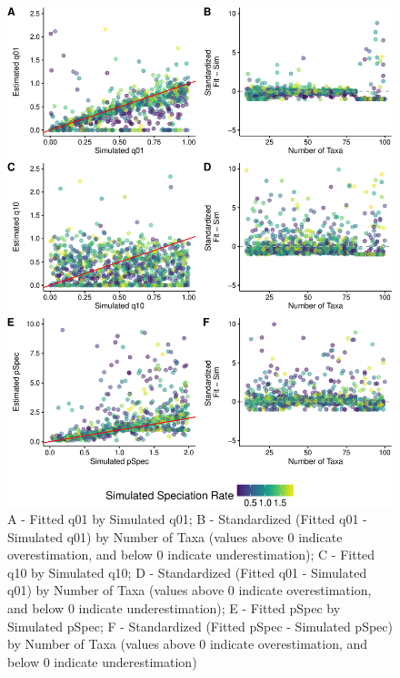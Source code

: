 \documentclass[12pt,]{article}
\begin{document}
\begin{figure}[htbp]
\centering
\includegraphics{report_Nov8th_files/figure-latex/unnamed-chunk-5-1.pdf}
\caption{A - Fitted q01 by Simulated q01; B - Standardized (Fitted q01 -
Simulated q01) by Number of Taxa (values above 0 indicate
overestimation, and below 0 indicate underestimation); C - Fitted q10 by
Simulated q10; D - Standardized (Fitted q01 - Simulated q01) by Number
of Taxa (values above 0 indicate overestimation, and below 0 indicate
underestimation); E - Fitted pSpec by Simulated pSpec; F - Standardized
(Fitted pSpec - Simulated pSpec) by Number of Taxa (values above 0
indicate overestimation, and below 0 indicate underestimation)}
\end{figure}
\end{document}

